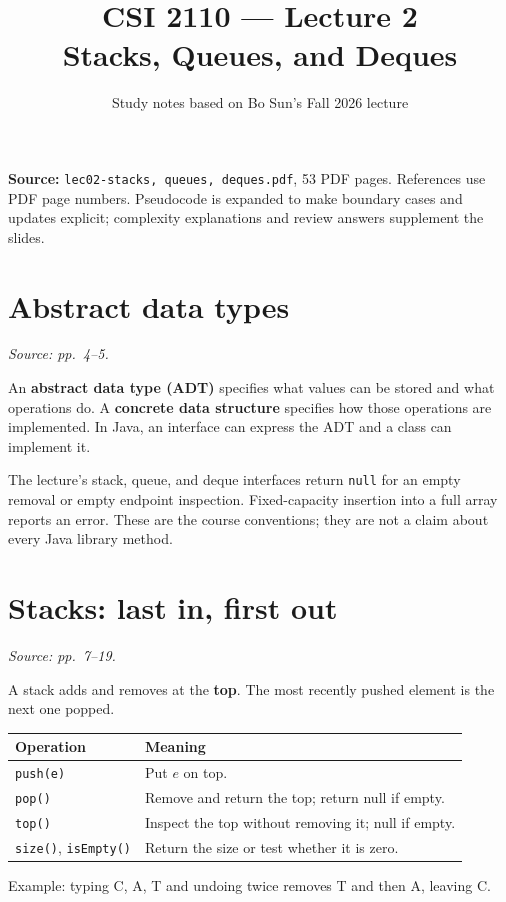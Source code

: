 \documentclass[11pt]{article}
\title{CSI 2110 --- Lecture 2\\Stacks, Queues, and Deques}
\author{Study notes based on Bo Sun's Fall 2026 lecture}
\date{}
\begin{document}
\maketitle
\textbf{Source:} \texttt{lec02-stacks, queues, deques.pdf}, 53 PDF pages. References use PDF page numbers. Pseudocode is expanded to make boundary cases and updates explicit; complexity explanations and review answers supplement the slides.

\section{Abstract data types}
\textit{Source: pp.\ 4--5.}

An \textbf{abstract data type (ADT)} specifies what values can be stored and what operations do. A \textbf{concrete data structure} specifies how those operations are implemented. In Java, an interface can express the ADT and a class can implement it.

The lecture's stack, queue, and deque interfaces return \texttt{null} for an empty removal or empty endpoint inspection. Fixed-capacity insertion into a full array reports an error. These are the course conventions; they are not a claim about every Java library method.

\section{Stacks: last in, first out}
\textit{Source: pp.\ 7--19.}

A stack adds and removes at the \textbf{top}. The most recently pushed element is the next one popped.
\begin{center}
\begin{tabularx}{\textwidth}{lX}
\toprule
Operation & Meaning\\
\midrule
\texttt{push(e)} & Put $e$ on top.\\
\texttt{pop()} & Remove and return the top; return null if empty.\\
\texttt{top()} & Inspect the top without removing it; null if empty.\\
\texttt{size()}, \texttt{isEmpty()} & Return the size or test whether it is zero.\\
\bottomrule
\end{tabularx}
\end{center}
Example: typing C, A, T and undoing twice removes T and then A, leaving C.
\end{document}
